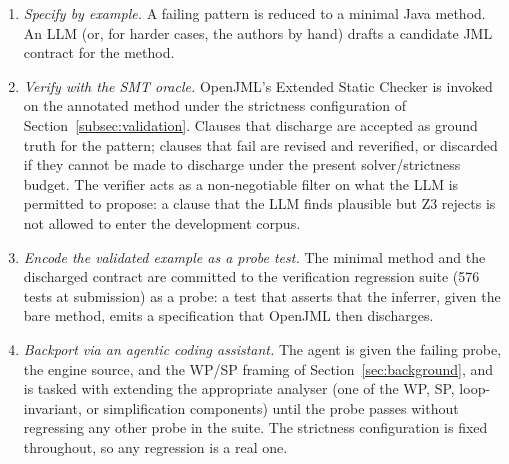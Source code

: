 \begin{enumerate}
    \item \emph{Specify by example.} A failing pattern is reduced to a minimal Java method. An LLM (or, for harder cases, the authors by hand) drafts a candidate JML contract for the method.
    \item \emph{Verify with the SMT oracle.} OpenJML's Extended Static Checker is invoked on the annotated method under the strictness configuration of Section~\ref{subsec:validation}. Clauses that discharge are accepted as ground truth for the pattern; clauses that fail are revised and reverified, or discarded if they cannot be made to discharge under the present solver/strictness budget. The verifier acts as a non-negotiable filter on what the LLM is permitted to propose: a clause that the LLM finds plausible but Z3 rejects is not allowed to enter the development corpus.
    \item \emph{Encode the validated example as a probe test.} The minimal method and the discharged contract are committed to the verification regression suite (576 tests at submission) as a probe: a test that asserts that the inferrer, given the bare method, emits a specification that OpenJML then discharges.
    \item \emph{Backport via an agentic coding assistant.} The agent is given the failing probe, the engine source, and the WP/SP framing of Section~\ref{sec:background}, and is tasked with extending the appropriate analyser (one of the WP, SP, loop-invariant, or simplification components) until the probe passes without regressing any other probe in the suite. The strictness configuration is fixed throughout, so any regression is a real one.
\end{enumerate}

